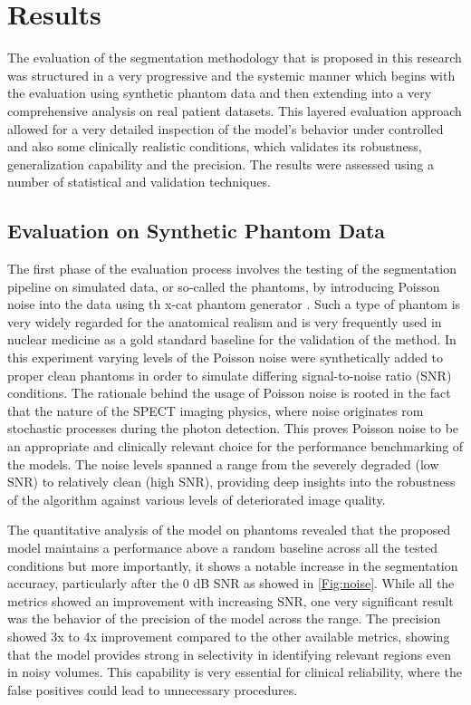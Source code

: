 \chapter{Results}
\label{ch:results}

The evaluation of the segmentation methodology that is proposed in this research was structured in a very progressive and the systemic manner which begins with the evaluation using synthetic phantom data and then extending into a very comprehensive analysis on real patient datasets. This layered evaluation approach allowed for a very detailed inspection of the model's behavior under controlled and also some clinically realistic conditions, which validates its robustness, generalization capability and the precision. The results were assessed using a number of statistical and validation techniques.

\section{Evaluation on Synthetic Phantom Data}
The first phase of the evaluation process involves the testing of the segmentation pipeline on simulated data, or so-called the phantoms, by introducing Poisson noise into the data using th x-cat phantom generator \cite{xcat}. Such a type of phantom is very widely regarded for the anatomical realism and is very frequently used in nuclear medicine as a gold standard baseline for the validation of the method. In this experiment varying levels of the Poisson noise were synthetically added to proper clean phantoms in order to simulate differing signal-to-noise ratio (SNR) conditions. The rationale behind the usage of Poisson noise is rooted in the fact that the nature of the SPECT imaging physics, where noise originates rom stochastic processes during the photon detection. This proves Poisson noise to be an appropriate and clinically relevant choice for the performance benchmarking of the models. The noise levels spanned a range from the severely degraded (low SNR) to relatively clean (high SNR), providing deep insights into the robustness of the algorithm against various levels of deteriorated image quality.

The quantitative analysis of the model on phantoms revealed that the proposed model maintains a performance above a random baseline across all the tested conditions but more importantly, it shows a notable increase in the segmentation accuracy, particularly after the 0 dB SNR as showed in \cref{Fig:noise}. While all the metrics showed an improvement with increasing SNR, one very significant result was the behavior of the precision of the model across the range. The precision showed 3x to 4x improvement compared to the other available metrics, showing that the model provides strong in selectivity in identifying relevant regions even in noisy volumes. This capability is very essential for clinical reliability, where the false positives could lead to unnecessary procedures.

